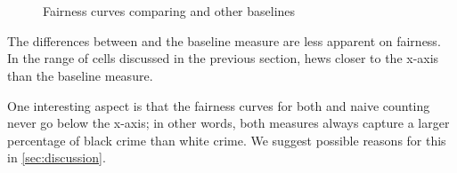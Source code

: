 \begin{figure}[bth]
    \myfloatalign
     \\
     \\
    \caption[Fairness curves comparing \pp and other baselines]{Fairness curves comparing \pp and other baselines}\label{fig:fairness}
\end{figure}

The differences between \pp and the baseline measure are less apparent on fairness. In the range of cells discussed in the previous section, \pp hews closer to the x-axis than the baseline measure.

One interesting aspect is that the fairness curves for both \pp and naive counting never go below the x-axis; in other words, both measures always capture a larger percentage of black crime than white crime. We suggest possible reasons for this in \autoref{sec:discussion}.

